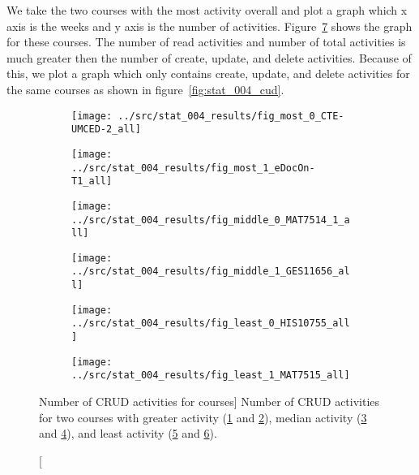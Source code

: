 We take the two courses with the most activity overall and plot a graph which x
axis is the weeks and y axis is the number of activities.
Figure~\ref{fig:stat_004_all} shows the graph for these courses. The number of
read activities and number of total activities is much greater then the number
of create, update, and delete activities. Because of this, we plot a graph
which only contains create, update, and delete activities for the same courses
as shown in figure~\ref{fig:stat_004_cud}.

\begin{figure}[h!]
    \centering

    \begin{subfigure}{.5\textwidth}
        \centering
        \texttt{[image: ../src/stat\_004\_results/fig\_most\_0\_CTE-UMCED-2\_all]}
        \caption[]{}
        \label{subfig:stat_most_004_0_all}
    \end{subfigure}%
    \begin{subfigure}{.5\textwidth}
        \centering
        \texttt{[image: ../src/stat\_004\_results/fig\_most\_1\_eDocOn-T1\_all]}
        \caption[]{}
        \label{subfig:stat_most_004_1_all}
    \end{subfigure}

    \begin{subfigure}{.5\textwidth}
        \centering
        \texttt{[image: ../src/stat\_004\_results/fig\_middle\_0\_MAT7514\_1\_all]}
        \caption[]{}
        \label{subfig:stat_middle_004_0_all}
    \end{subfigure}%
    \begin{subfigure}{.5\textwidth}
        \centering
        \texttt{[image: ../src/stat\_004\_results/fig\_middle\_1\_GES11656\_all]}
        \caption[]{}
        \label{subfig:stat_middle_004_1_all}
    \end{subfigure}

    \begin{subfigure}{.5\textwidth}
        \centering
        \texttt{[image: ../src/stat\_004\_results/fig\_least\_0\_HIS10755\_all]}
        \caption[]{}
        \label{subfig:stat_least_004_0_all}
    \end{subfigure}%
    \begin{subfigure}{.5\textwidth}
        \centering
        \texttt{[image: ../src/stat\_004\_results/fig\_least\_1\_MAT7515\_all]}
        \caption[]{}
        \label{subfig:stat_least_004_1_all}
    \end{subfigure}

    \caption
        [Number of CRUD activities for courses]
        {Number of CRUD activities for two courses with greater activity
        (\ref{subfig:stat_most_004_0_all} and
        \ref{subfig:stat_most_004_1_all}), median activity
        (\ref{subfig:stat_middle_004_0_all} and
        \ref{subfig:stat_middle_004_1_all}), and least activity
        (\ref{subfig:stat_least_004_0_all} and
        \ref{subfig:stat_least_004_1_all}).}

    \label{fig:stat_004_all}
\end{figure}

